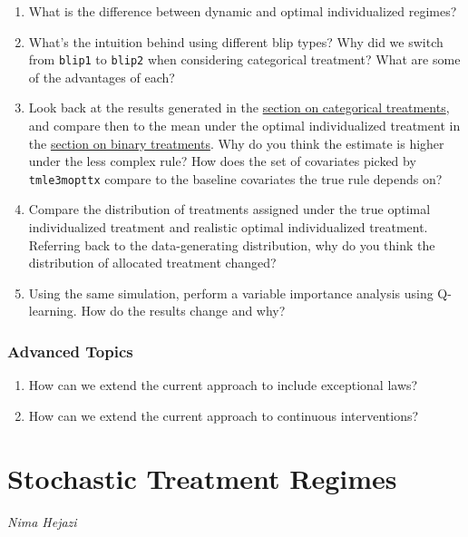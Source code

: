 \documentclass[12pt, krantz2,]{krantz}
\theoremstyle{definition}
\theoremstyle{definition}
\theoremstyle{definition}
\newcommand{\1}{\mathbbm{1}}
\begin{document}
\begin{enumerate}
\def\labelenumi{\arabic{enumi}.}
\item
  What is the difference between dynamic and optimal individualized regimes?
\item
  What's the intuition behind using different blip types? Why did we switch
  from \texttt{blip1} to \texttt{blip2} when considering categorical treatment? What are some
  of the advantages of each?
\item
  Look back at the results generated in the \protect\hyperlink{oit-eval-cat}{section on categorical
  treatments}, and compare then to the mean under the optimal
  individualized treatment in the \protect\hyperlink{oit-eval-bin}{section on binary
  treatments}. Why do you think the estimate is higher under the
  less complex rule? How does the set of covariates picked by \texttt{tmle3mopttx}
  compare to the baseline covariates the true rule depends on?
\item
  Compare the distribution of treatments assigned under the true optimal
  individualized treatment and realistic optimal individualized treatment.
  Referring back to the data-generating distribution, why do you think the
  distribution of allocated treatment changed?
\item
  Using the same simulation, perform a variable importance analysis using
  Q-learning. How do the results change and why?
\end{enumerate}

\hypertarget{advanced-topics-1}{%
\subsubsection{Advanced Topics}\label{advanced-topics-1}}

\begin{enumerate}
\def\labelenumi{\arabic{enumi}.}
\item
  How can we extend the current approach to include exceptional laws?
\item
  How can we extend the current approach to continuous interventions?
\end{enumerate}

\hypertarget{stochastic-treatment-regimes}{%
\section{Stochastic Treatment Regimes}\label{stochastic-treatment-regimes}}

\emph{Nima Hejazi}
\end{document}
